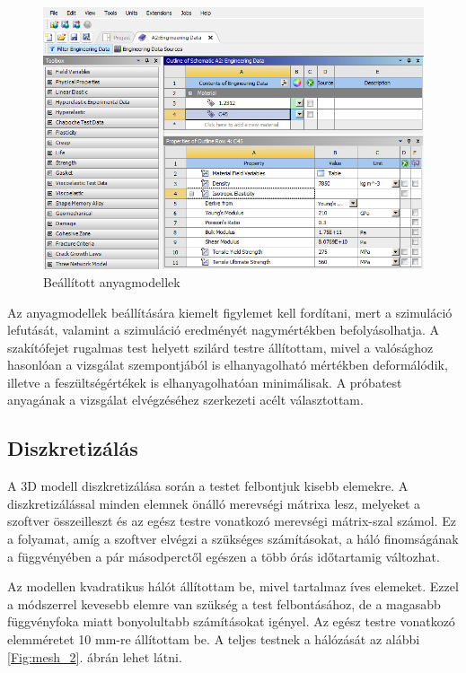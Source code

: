 \documentclass[12pt,a4paper,oneside]{report}
\begin{document}
\begin{figure}[H]
    \centering
    \includegraphics[width=15cm]{figures/ansys_2.png}
    \caption{Beállított anyagmodellek}
    \label{Fig:ansys_2}
\end{figure}

Az anyagmodellek beállítására kiemelt figylemet kell fordítani, mert a szimuláció lefutását, valamint a szimuláció eredményét nagymértékben befolyásolhatja. A szakítófejet rugalmas test helyett szilárd testre állítottam, mivel a valósághoz hasonlóan a vizsgálat szempontjából is elhanyagolható mértékben deformálódik, illetve a feszültségértékek is elhanyagolhatóan minimálisak. A próbatest anyagának a vizsgálat elvégzéséhez szerkezeti acélt választottam.

\subsection{Diszkretizálás}
A 3D modell diszkretizálása során a testet felbontjuk kisebb elemekre. A diszkretizálással minden elemnek önálló merevségi mátrixa lesz, melyeket a szoftver összeilleszt és az egész testre vonatkozó merevségi mátrix-szal számol. Ez a folyamat, amíg a szoftver elvégzi a szükséges számításokat, a háló finomságának a függvényében a pár másodperctől egészen a több órás időtartamig változhat.

Az modellen kvadratikus hálót állítottam be, mivel tartalmaz íves elemeket. Ezzel a módszerrel kevesebb elemre van szükség a test felbontásához, de a magasabb függvényfoka miatt bonyolultabb számításokat igényel. Az egész testre vonatkozó elemméretet 10 mm-re állítottam be. A teljes testnek a hálózását az alábbi \ref{Fig:mesh_2}. ábrán lehet látni.
\end{document}
